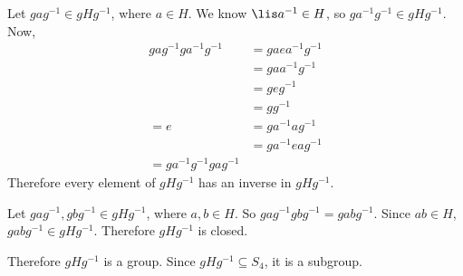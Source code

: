         Let $gag^{-1} \in gHg^{-1}$, where $a \in H$.
        We know $\lis a^{-1} \in H$, so $ga^{-1}g^{-1} \in gHg^{-1}$.
        Now, 
        \begin{align*}
            gag^{-1}ga^{-1}g^{-1} 
            &= gaea^{-1}g^{-1} \\
            &= gaa^{-1}g^{-1} \\
            &= geg^{-1} \\
            &= gg^{-1} \\
            = e 
            &= ga^{-1}ag^{-1} \\
            &= ga^{-1}eag^{-1} \\
            = ga^{-1}g^{-1}gag^{-1} 
        \end{align*}
        Therefore every element of $gHg^{-1}$ has an inverse in $gHg^{-1}$.

        Let $gag^{-1}, gbg^{-1} \in gHg^{-1}$, where $a,b \in H$.
        So $gag^{-1}gbg^{-1} = gabg^{-1}$.
        Since $ab \in H$, $gabg^{-1} \in gHg^{-1}$.
        Therefore $gHg^{-1}$ is closed.

        Therefore $gHg^{-1}$ is a group.
        Since $gHg^{-1} \subseteq S_4$, it is a subgroup.